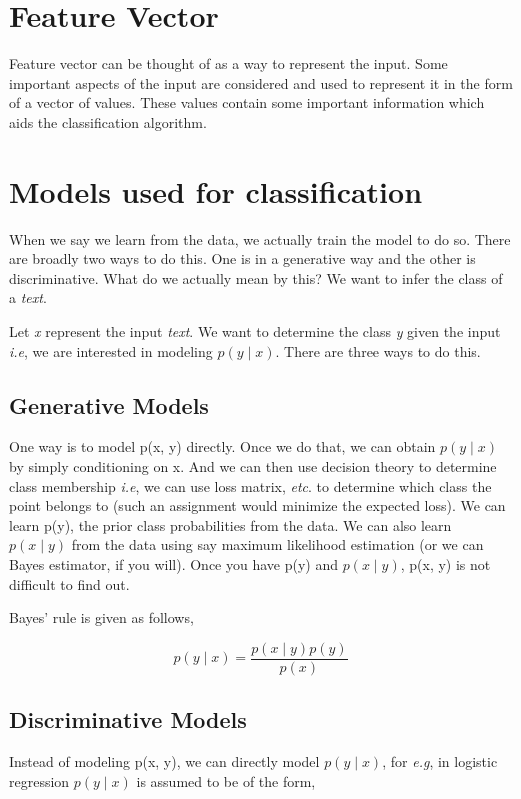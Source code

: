 \section{Feature Vector}
\par
Feature vector can be thought of as a way to represent the input. Some important aspects of the input are considered and used 
to represent it in the form of a vector of values. These values contain some important information which aids the classification
algorithm. 

\section{Models used for classification}
\par 
When we say we learn from the data, we actually train the model to do so. There are broadly two ways to do this. One is in a 
generative way and the other is discriminative. What do we actually mean by this? We want to infer the class of a \textit{text}.

\par
Let \textit{x} represent the input \textit{text}. We want to determine the class \textit{y} given the input \textit{i.e}, we are interested
in modeling \(p(y\mid x)\). There are three ways to do this.

\subsection{Generative Models}

\par 
One way is to model p(x, y) directly. Once we do that, we can obtain \(p(y \mid x)\) by simply conditioning on x. And we can then use decision 
theory to determine class membership \textit{i.e}, we can use loss matrix, \textit{etc}. to determine which class the point belongs to (such an assignment 
would minimize the expected loss). We can learn p(y), the prior class probabilities from the data. We can also learn \(p(x\mid y)\) from
the data using say maximum likelihood estimation (or we can Bayes estimator, if you will). Once you have p(y) and \(p(x\mid y)\), p(x, y) is 
not difficult to find out.

Bayes' rule is given as follows,

\begin{equation}
  p(y\mid x) = \frac{p(x\mid y)p(y)}{p(x)}
\end{equation}

\subsection{Discriminative Models}
Instead of modeling p(x, y), we can directly model \(p(y\mid x)\), for \textit{e.g}, in logistic regression \(p(y\mid x)\) is assumed to be of the form, 

